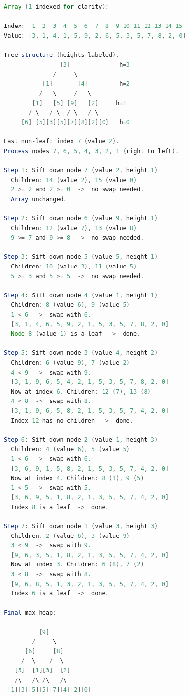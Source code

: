 \begin{lstlisting}[language=Java]
Array (1-indexed for clarity):

Index:  1  2  3  4  5  6  7  8  9 10 11 12 13 14 15
Value: [3, 1, 4, 1, 5, 9, 2, 6, 5, 3, 5, 7, 8, 2, 0]

Tree structure (heights labeled):
                [3]              h=3
              /     \
           [1]       [4]         h=2
          /   \     /   \
        [1]   [5] [9]   [2]     h=1
       / \   / \  / \   / \
     [6] [5][3][5][7][8][2][0]   h=0

Last non-leaf: index 7 (value 2).
Process nodes 7, 6, 5, 4, 3, 2, 1 (right to left).

Step 1: Sift down node 7 (value 2, height 1)
  Children: 14 (value 2), 15 (value 0)
  2 >= 2 and 2 >= 0  ->  no swap needed.
  Array unchanged.

Step 2: Sift down node 6 (value 9, height 1)
  Children: 12 (value 7), 13 (value 8)
  9 >= 7 and 9 >= 8  ->  no swap needed.

Step 3: Sift down node 5 (value 5, height 1)
  Children: 10 (value 3), 11 (value 5)
  5 >= 3 and 5 >= 5  ->  no swap needed.

Step 4: Sift down node 4 (value 1, height 1)
  Children: 8 (value 6), 9 (value 5)
  1 < 6  ->  swap with 6.
  [3, 1, 4, 6, 5, 9, 2, 1, 5, 3, 5, 7, 8, 2, 0]
  Node 8 (value 1) is a leaf  ->  done.

Step 5: Sift down node 3 (value 4, height 2)
  Children: 6 (value 9), 7 (value 2)
  4 < 9  ->  swap with 9.
  [3, 1, 9, 6, 5, 4, 2, 1, 5, 3, 5, 7, 8, 2, 0]
  Now at index 6. Children: 12 (7), 13 (8)
  4 < 8  ->  swap with 8.
  [3, 1, 9, 6, 5, 8, 2, 1, 5, 3, 5, 7, 4, 2, 0]
  Index 12 has no children  ->  done.

Step 6: Sift down node 2 (value 1, height 3)
  Children: 4 (value 6), 5 (value 5)
  1 < 6  ->  swap with 6.
  [3, 6, 9, 1, 5, 8, 2, 1, 5, 3, 5, 7, 4, 2, 0]
  Now at index 4. Children: 8 (1), 9 (5)
  1 < 5  ->  swap with 5.
  [3, 6, 9, 5, 1, 8, 2, 1, 3, 5, 5, 7, 4, 2, 0]
  Index 8 is a leaf  ->  done.

Step 7: Sift down node 1 (value 3, height 3)
  Children: 2 (value 6), 3 (value 9)
  3 < 9  ->  swap with 9.
  [9, 6, 3, 5, 1, 8, 2, 1, 3, 5, 5, 7, 4, 2, 0]
  Now at index 3. Children: 6 (8), 7 (2)
  3 < 8  ->  swap with 8.
  [9, 6, 8, 5, 1, 3, 2, 1, 3, 5, 5, 7, 4, 2, 0]
  Index 6 is a leaf  ->  done.

Final max-heap:

          [9]
        /     \
      [6]     [8]
     /  \    /  \
   [5]  [1][3]  [2]
   /\   /\ /\   /\
 [1][3][5][5][7][4][2][0]
\end{lstlisting}

